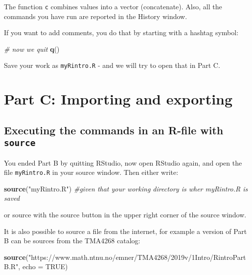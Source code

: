\documentclass[]{article}
\newenvironment{Shaded}{\begin{snugshade}}{\end{snugshade}}
\newcommand{\KeywordTok}[1]{\textcolor[rgb]{0.13,0.29,0.53}{\textbf{#1}}}
\newcommand{\DataTypeTok}[1]{\textcolor[rgb]{0.13,0.29,0.53}{#1}}
\newcommand{\StringTok}[1]{\textcolor[rgb]{0.31,0.60,0.02}{#1}}
\newcommand{\CommentTok}[1]{\textcolor[rgb]{0.56,0.35,0.01}{\textit{#1}}}
\newcommand{\OtherTok}[1]{\textcolor[rgb]{0.56,0.35,0.01}{#1}}
\newcommand{\NormalTok}[1]{#1}
\begin{document}
The function \texttt{c} combines values into a vector (concatenate).
Also, all the commands you have run are reported in the History window.

If you want to add comments, you do that by starting with a hashtag
symbol:

\begin{Shaded}
\begin{Highlighting}[]
\CommentTok{# now we quit}
\KeywordTok{q}\NormalTok{()}
\end{Highlighting}
\end{Shaded}

Save your work as \texttt{myRintro.R} - and we will try to open that in
Part C.

\section{Part C: Importing and
exporting}\label{part-c-importing-and-exporting}

\subsection{\texorpdfstring{Executing the commands in an R-file with
\texttt{source}}{Executing the commands in an R-file with source}}\label{executing-the-commands-in-an-r-file-with-source}

You ended Part B by quitting RStudio, now open RStudio again, and open
the file \texttt{myRintro.R} in your source window. Then either write:

\begin{Shaded}
\begin{Highlighting}[]
\KeywordTok{source}\NormalTok{(}\StringTok{"myRintro.R"}\NormalTok{)  }\CommentTok{#given that your working directory is wher myRintro.R is saved}
\end{Highlighting}
\end{Shaded}

or source with the source button in the upper right corner of the source
window.

It is also possible to source a file from the internet, for example a
version of Part B can be sources from the TMA4268 catalog:

\begin{Shaded}
\begin{Highlighting}[]
\KeywordTok{source}\NormalTok{(}\StringTok{"https://www.math.ntnu.no/emner/TMA4268/2019v/1Intro/RintroPartB.R"}\NormalTok{, }
    \DataTypeTok{echo =} \OtherTok{TRUE}\NormalTok{)}
\end{Highlighting}
\end{Shaded}
\end{document}
